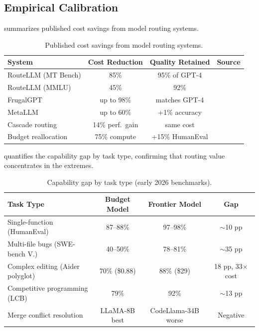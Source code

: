 \subsection{Empirical Calibration}

 summarizes published cost savings from model routing systems.

\begin{table}[htbp]
\centering
\caption{Published cost savings from model routing systems.}
\label{tab:routing-savings}
\small
\begin{tabular}{lccl}
\toprule
\textbf{System} & \textbf{Cost Reduction} & \textbf{Quality Retained} & \textbf{Source} \\
\midrule
RouteLLM (MT Bench) & 85\% & 95\% of GPT-4 & \citet{routellm2025} \\
RouteLLM (MMLU) & 45\% & 92\% & \citet{routellm2025} \\
FrugalGPT & up to 98\% & matches GPT-4 & \citet{frugalgpt2023} \\
MetaLLM & up to 60\% & +1\% accuracy & \citet{metallm2024} \\
Cascade routing & 14\% perf.\ gain & same cost & \citet{dekoninck2025cascade} \\
Budget reallocation & 75\% compute & +15\% HumanEval & \citet{hassid2024budget} \\
\bottomrule
\end{tabular}
\end{table}

 quantifies the capability gap by task type, confirming that routing value concentrates in the extremes.

\begin{table}[htbp]
\centering
\caption{Capability gap by task type (early 2026 benchmarks).}
\label{tab:routing-capgaps}
\small
\begin{tabular}{lccc}
\toprule
\textbf{Task Type} & \textbf{Budget Model} & \textbf{Frontier Model} & \textbf{Gap} \\
\midrule
Single-function (HumanEval) & 87--88\% & 97--98\% & $\sim$10 pp \\
Multi-file bugs (SWE-bench V.) & 40--50\% & 78--81\% & $\sim$35 pp \\
Complex editing (Aider polyglot) & 70\% (\$0.88) & 88\% (\$29) & 18 pp, 33$\times$ cost \\
Competitive programming (LCB) & 79\% & 92\% & $\sim$13 pp \\
Merge conflict resolution & LLaMA-8B best & CodeLlama-34B worse & Negative \\
\bottomrule
\end{tabular}
\end{table}

